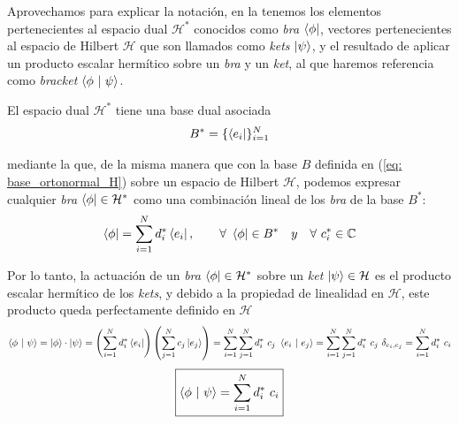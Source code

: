 \documentclass{article}
\numberwithin{equation}{section} %
\begin{document}
    Aprovechamos para explicar la notación, en la tenemos los elementos pertenecientes al espacio dual \( \mathcal{H} ^ {*} \) conocidos como \textit{bra} \( \bra{\phi} \), vectores pertenecientes al espacio de Hilbert \( \mathcal{H} \) que son llamados como \textit{kets} \( \ket{\psi} \), y el resultado de aplicar un producto escalar hermítico sobre un \textit{bra} y un \textit{ket}, al que haremos referencia como \textit{bracket} \( \braket{\phi \ | \ \psi} \).

    \vspace{5mm}

    El espacio dual \( \mathcal{H} ^ {*} \) tiene una base dual asociada
    \begin{equation}
        B ^ {*} = \{ \bra{e_{i}} \} _{i = 1}^{N}
    \end{equation}

    \vspace{1.5mm}

    mediante la que, de la misma manera que con la base \( B \) definida en (\ref{eq: base_ortonormal_H}) sobre un espacio de Hilbert \( \mathcal{H} \), podemos expresar cualquier \textit{bra} \( \bra{\phi} \in \mathcal{H} ^ {*} \) como una combinación lineal de los \textit{bra} de la base \( B ^ {*} \):
    \begin{equation}
        \bra{\phi} = \sum_{i = 1}^{N} d_{i}^{*} \bra{e_{i}}, \qquad \forall \ \bra{\phi} \in B^{*} \quad y \quad \forall \ c_{i}^{*} \in \mathbb{C}
    \end{equation}    

    \vspace{1.5mm}

    Por lo tanto, la actuación de un \textit{bra} \( \bra{\phi} \in \mathcal{H}^{*} \) sobre un \textit{ket} \( \ket{\psi} \in \mathcal{H} \) es el producto escalar hermítico de los \textit{kets}, y debido a la propiedad de linealidad en \( \mathcal{H} \), este producto queda perfectamente definido en \( \mathcal{H} \)
    \begin{equation*}
        \braket{\phi \ | \ \psi} = \ket{\phi} \cdot \ket{\psi} = \left( \sum_{i = 1}^{N} d_{i}^{*} \bra{e_{i}} \right) \left( \sum_{j = 1}^{N} c_{j} \ket{e_{j}} \right) = \sum_{i = 1}^{N} \sum_{j = 1}^{N} d_{i}^{*} \ c_{j} \ \braket{e_{i} \ | \ e_{j}} = \sum_{i = 1}^{N} \sum_{j = 1}^{N} d_{i}^{*} \ c_{j} \ \delta_{e_{i}, e_{j}} = \sum_{i = 1}^{N} d_{i}^{*} \ c_{i}
    \end{equation*}
    \begin{equation}
        \boxed{\braket{\phi \ | \ \psi} = \sum_{i = 1}^{N} d_{i}^{*} \ c_{i}}
    \end{equation}
\end{document}
